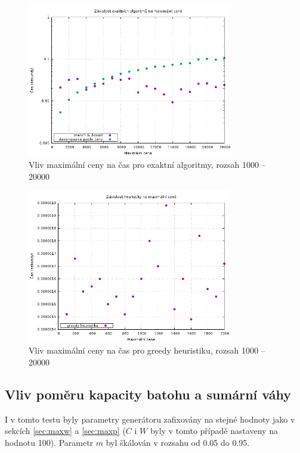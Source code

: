 \documentclass[11pt]{article}
\begin{document}
\begin{figure}[h!]
	\centering
    	\includegraphics[width=0.8\textwidth]{../data/max_price_times20000.png}
	\caption{Vliv maximální ceny na čas pro exaktní algoritmy, rozsah 1000 -- 20000}
	\label{fig:price20000}
\end{figure}

\begin{figure}[h!]
	\centering
    	\includegraphics[width=0.8\textwidth]{../data/greedy_price.png}
	\caption{Vliv maximální ceny na čas pro greedy heuristiku, rozsah 1000 -- 20000}
	\label{fig:greedy_price}
\end{figure}

\subsection{Vliv poměru kapacity batohu a sumární váhy}

I v tomto testu byly parametry generátoru zafixovány na stejné hodnoty jako v sekcích \ref{sec:maxw} a \ref{sec:maxp} ($C$ i $W$ byly v tomto případě nastaveny na hodnotu 100). Parametr $m$ byl škálován v rozsahu od 0.05 do 0.95.
\end{document}
